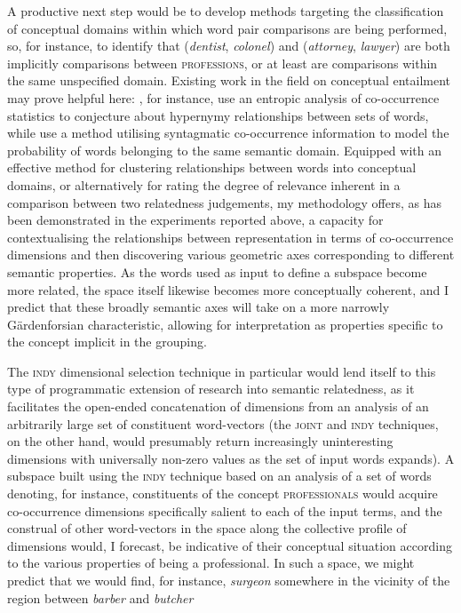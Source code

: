 A productive next step would be to develop methods targeting the classification of conceptual domains within which word pair comparisons are being performed, so, for instance, to identify that (\emph{dentist}, \emph{colonel}) and (\emph{attorney}, \emph{lawyer}) are both implicitly comparisons between \textsc{professions}, or at least are comparisons within the same unspecified domain.  Existing work in the field on conceptual entailment may prove helpful here: \cite{HerbelotEA2013}, for instance, use an entropic analysis of co-occurrence statistics to conjecture about hypernymy relationships between sets of words, while \cite{MelamudEA2014} use a method utilising syntagmatic co-occurrence information to model the probability of words belonging to the same semantic domain.  Equipped with an effective method for clustering relationships between words into conceptual domains, or alternatively for rating the degree of relevance inherent in a comparison between two relatedness judgements, my methodology offers, as has been demonstrated in the experiments reported above, a capacity for contextualising the relationships between representation in terms of co-occurrence dimensions and then discovering various geometric axes corresponding to different semantic properties.  As the words used as input to define a subspace become more related, the space itself likewise becomes more conceptually coherent, and I predict that these broadly semantic axes will take on a more narrowly G\"{a}rdenforsian characteristic, allowing for interpretation as properties specific to the concept implicit in the grouping.

The \textsc{indy} dimensional selection technique in particular would lend itself to this type of programmatic extension of research into semantic relatedness, as it facilitates the open-ended concatenation of dimensions from an analysis of an arbitrarily large set of constituent word-vectors (the \textsc{joint} and \textsc{indy} techniques, on the other hand, would presumably return increasingly uninteresting dimensions with universally non-zero values as the set of input words expands).  A subspace built using the \textsc{indy} technique based on an analysis of a set of words denoting, for instance, constituents of the concept \textsc{professionals} would acquire co-occurrence dimensions specifically salient to each of the input terms, and the construal of other word-vectors in the space along the collective profile of dimensions would, I forecast, be indicative of their conceptual situation according to the various properties of being a professional.  In such a space, we might predict that we would find, for instance, \emph{surgeon} somewhere in the vicinity of the region between \emph{barber} and \emph{butcher}

